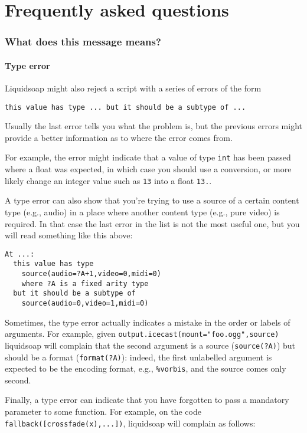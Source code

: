 \chapter{Frequently asked questions}
\subsection{What does this message means?}
\subsubsection{Type error}
Liquidsoap might also reject a script with a series of errors of the form
\begin{verbatim}
this value has type ... but it should be a subtype of ...
\end{verbatim}
Usually the last error tells you what the problem is, but the previous errors
might provide a better information as to where the error comes from.

For example, the error might indicate that a value of type \verb+int+ has been
passed where a float was expected, in which case you should use a conversion, or
more likely change an integer value such as \verb+13+ into a float \verb+13.+.

A type error can also show that you're trying to use a source of a certain
content type (e.g., audio) in a place where another content type (e.g., pure
video) is required. In that case the last error in the list is not the most
useful one, but you will read something like this above:

\begin{verbatim}
At ...:
  this value has type
    source(audio=?A+1,video=0,midi=0)
    where ?A is a fixed arity type
  but it should be a subtype of
    source(audio=0,video=1,midi=0)
\end{verbatim}
Sometimes, the type error actually indicates a mistake in the order or labels of
arguments. For example, given \verb+output.icecast(mount="foo.ogg",source)+
liquidsoap will complain that the second argument is a source
(\verb+source(?A)+) but should be a format (\verb+format(?A)+): indeed, the
first unlabelled argument is expected to be the encoding format, e.g.,
\verb+%vorbis+, and the source comes only second.

Finally, a type error can indicate that you have forgotten to pass a mandatory
parameter to some function. For example, on the code
\verb+fallback([crossfade(x),...])+, liquidsoap will complain as follows:

